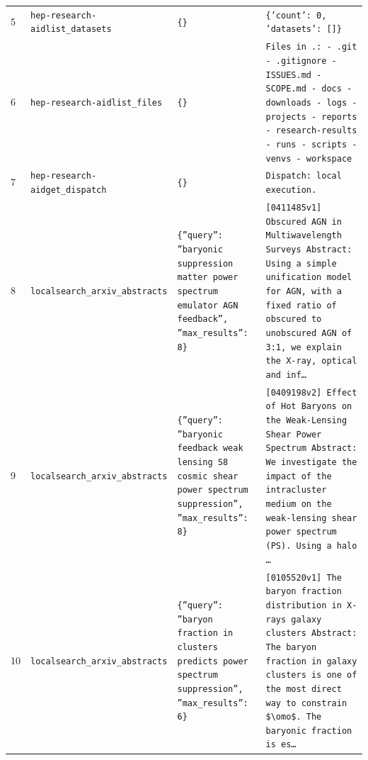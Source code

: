 \documentclass[11pt,a4paper]{article}
\begin{document}
\begin{longtable}{@{}p{}p{}p{}p{}@{}}
5 & \texttt{hep-research-aid}\newline\texttt{list\_\allowbreak{}datasets} & \texttt{\{\}\allowbreak{}} & \texttt{\{'count':\allowbreak{} 0,\allowbreak{} 'datasets':\allowbreak{} []\allowbreak{}\}\allowbreak{}} \\
6 & \texttt{hep-research-aid}\newline\texttt{list\_\allowbreak{}files} & \texttt{\{\}\allowbreak{}} & \texttt{Files in .:\allowbreak{}   - .git   - .gitignore   - ISSUES.md   - SCOPE.md   - docs   - downloads   - logs   - projects   - reports   - research-results   - runs   - scripts   - venvs   - workspace} \\
7 & \texttt{hep-research-aid}\newline\texttt{get\_\allowbreak{}dispatch} & \texttt{\{\}\allowbreak{}} & \texttt{Dispatch:\allowbreak{} local execution.} \\
8 & \texttt{local}\newline\texttt{search\_\allowbreak{}arxiv\_\allowbreak{}abstracts} & \texttt{\{''query'':\allowbreak{} ''baryonic suppression matter power spectrum emulator AGN feedback'',\allowbreak{} ''max\_\allowbreak{}results'':\allowbreak{} 8\}\allowbreak{}} & \texttt{[0411485v1]\allowbreak{} Obscured AGN in Multiwavelength Surveys Abstract:\allowbreak{}   Using a simple unification model for AGN,\allowbreak{} with a fixed ratio of obscured to unobscured AGN of 3:\allowbreak{}1,\allowbreak{} we explain the X-ray,\allowbreak{} optical and inf\ldots{}\allowbreak{}} \\
9 & \texttt{local}\newline\texttt{search\_\allowbreak{}arxiv\_\allowbreak{}abstracts} & \texttt{\{''query'':\allowbreak{} ''baryonic feedback weak lensing S8 cosmic shear power spectrum suppression'',\allowbreak{} ''max\_\allowbreak{}results'':\allowbreak{} 8\}\allowbreak{}} & \texttt{[0409198v2]\allowbreak{} Effect of Hot Baryons on the Weak-Lensing Shear Power Spectrum Abstract:\allowbreak{}   We investigate the impact of the intracluster medium on the weak-lensing shear power spectrum (PS)\allowbreak{}. Using a halo \ldots{}\allowbreak{}} \\
10 & \texttt{local}\newline\texttt{search\_\allowbreak{}arxiv\_\allowbreak{}abstracts} & \texttt{\{''query'':\allowbreak{} ''baryon fraction in clusters predicts power spectrum suppression'',\allowbreak{} ''max\_\allowbreak{}results'':\allowbreak{} 6\}\allowbreak{}} & \texttt{[0105520v1]\allowbreak{} The baryon fraction distribution in X-rays galaxy clusters Abstract:\allowbreak{}   The baryon fraction in galaxy clusters is one of the most direct way to constrain \$\textbackslash{}\allowbreak{}omo\$. The baryonic fraction is es\ldots{}\allowbreak{}} \\

\end{longtable}
\end{document}
